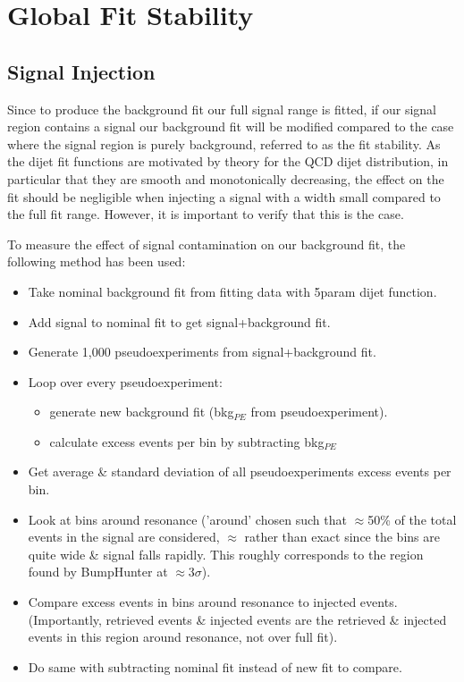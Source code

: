 \section{Global Fit Stability}
\subsection{Signal Injection}
Since to produce the background fit our full signal range is fitted, if our signal region contains a signal our background fit will be modified compared to the case where the signal region is purely background, referred to as the fit stability. As the dijet fit functions are motivated by theory for the QCD dijet distribution, in particular that they are smooth and monotonically decreasing, the effect on the fit should be negligible when injecting a signal with a width small compared to the full fit range. However, it is important to verify that this is the case.

To measure the effect of signal contamination on our background fit, the following method has been used:

\begin{itemize}
    \item Take nominal background fit from fitting data with 5param dijet function.
    \item Add signal to nominal fit to get signal+background fit.
    \item Generate 1,000 pseudoexperiments from signal+background fit.
    \item Loop over every pseudoexperiment:
    \begin{itemize}
        \item generate new background fit (bkg$_{PE}$ from pseudoexperiment).
        \item calculate excess events per bin by subtracting bkg$_{PE}$
    \end{itemize}
    \item Get average \& standard deviation of all pseudoexperiments excess events per bin.
    \item Look at bins around resonance ('around' chosen such that $\approx$50\% of the total events in the signal are considered, $\approx$ rather than exact since the bins are quite wide \& signal falls rapidly. This roughly corresponds to the region found by BumpHunter at $\approx$3$\sigma$).
    \item Compare excess events in bins around resonance to injected events. (Importantly, retrieved events \& injected events are the retrieved \& injected events in this region around resonance, not over full fit).
    \item Do same with subtracting nominal fit instead of new fit to compare.
\end{itemize}

